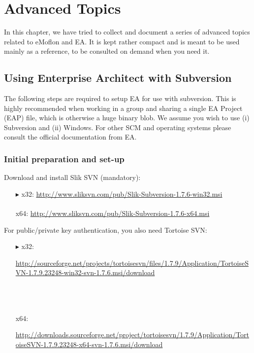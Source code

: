 \chapter{Advanced Topics}
\label{chap:advanced_topics}

In this chapter, we have tried to collect and document a series of advanced topics related to eMoflon and EA.
It is kept rather compact and is meant to be used mainly as a reference, to be consulted on demand when you need it.

\section{Using Enterprise Architect with Subversion}
The following steps are required to setup EA for use with subversion.
This is highly recommended when working in a group and sharing a single EA Project (EAP) file, which is otherwise a huge binary blob.
We assume you wish to use (i) Subversion and (ii) Windows.
For other SCM and operating systems please consult the official documentation from EA.

\subsection{Initial preparation and set-up}

Download and install Slik SVN (mandatory):
\begin{enumerate}
  \item[$\blacktriangleright$] x32: \small{\url{http://www.sliksvn.com/pub/Slik-Subversion-1.7.6-win32.msi}}\\\\
   x64: {\small \url{http://www.sliksvn.com/pub/Slik-Subversion-1.7.6-x64.msi}}
\end{enumerate}

For public/private key authentication, you also need Tortoise SVN:
 
\begin{enumerate}
  \item[$\blacktriangleright$] x32: {\small \begin{minipage}{.95\textwidth}  \url{http://sourceforge.net/projects/tortoisesvn/files/1.7.9/Application/TortoiseSVN-1.7.9.23248-win32-svn-1.7.6.msi/download}
    \end{minipage}}\\\\\\
  x64: {\small\begin{minipage}{.9\textwidth}  \url{http://downloads.sourceforge.net/project/tortoisesvn/1.7.9/Application/TortoiseSVN-1.7.9.23248-x64-svn-1.7.6.msi/download}\end{minipage}}
\end{enumerate} 

